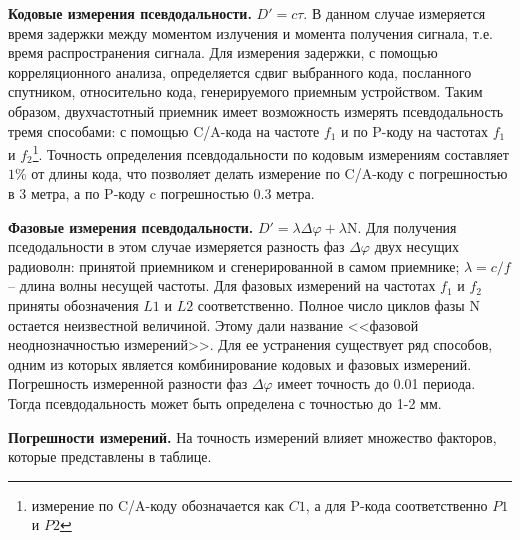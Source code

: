 \documentclass[14pt,eqno, fontsize=14pt]{article}
\begin{document}
\textbf{Кодовые измерения псевдодальности.} $D' = c \tau$. В данном случае измеряется время задержки между моментом излучения и момента получения сигнала, т.е. время распространения сигнала. Для измерения задержки, с помощью корреляционного анализа, определяется сдвиг выбранного кода, посланного спутником, относительно кода, генерируемого приемным устройством. Таким образом, двухчастотный приемник имеет возможность измерять псевдодальность тремя способами: с помощью C/A-кода на частоте $f_1$ и по P-коду на частотах $f_1$ и $f_2$\footnote{измерение по C/A-коду обозначается как $C1$, а для P-кода соответственно $P1$ и $P2$}. Точность определения псевдодальности по кодовым измерениям составляет $1\%$ от длины кода, что позволяет делать измерение по C/A-коду с погрешностью в 3 метра, а по P-коду c погрешностью 0.3 метра.

\textbf{Фазовые измерения псевдодальности.} $D' = \lambda \Delta \varphi + \lambda \text{N}$. Для получения пседодальности в этом случае измеряется разность фаз $\Delta\varphi$ двух несущих радиоволн: принятой приемником и сгенерированной в самом приемнике; $\lambda = c / f$ -- длина волны несущей частоты. Для фазовых измерений на частотах $f_1$ и $f_2$ приняты обозначения $L1$ и $L2$ соответственно. Полное число циклов фазы N остается неизвестной величиной. Этому дали название <<фазовой неоднозначностью измерений>>. Для ее устранения существует ряд способов, одним из которых является комбинирование кодовых и фазовых измерений. Погрешность измеренной разности фаз $\Delta\varphi$ имеет точность до 0.01 периода. Тогда псевдодальность может быть определена с точностью до 1-2 мм.

\textbf{Погрешности измерений.} На точность измерений влияет множество факторов, которые представлены в таблице.
\end{document}
